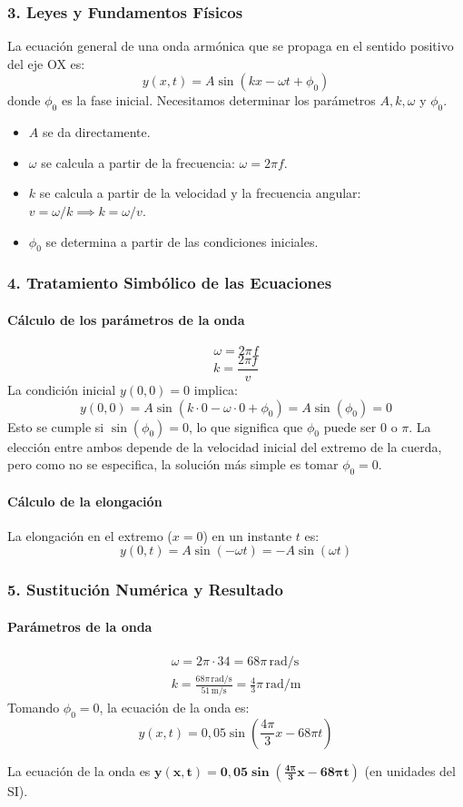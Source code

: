 \subsubsection*{3. Leyes y Fundamentos Físicos}
La ecuación general de una onda armónica que se propaga en el sentido positivo del eje OX es:
$$y(x,t) = A \sin(kx - \omega t + \phi_0)$$
donde $\phi_0$ es la fase inicial. Necesitamos determinar los parámetros $A, k, \omega$ y $\phi_0$.
\begin{itemize}
    \item $A$ se da directamente.
    \item $\omega$ se calcula a partir de la frecuencia: $\omega = 2\pi f$.
    \item $k$ se calcula a partir de la velocidad y la frecuencia angular: $v = \omega/k \implies k = \omega/v$.
    \item $\phi_0$ se determina a partir de las condiciones iniciales.
\end{itemize}

\subsubsection*{4. Tratamiento Simbólico de las Ecuaciones}
\paragraph*{Cálculo de los parámetros de la onda}
$$\omega = 2\pi f$$
$$k = \frac{2\pi f}{v}$$
La condición inicial $y(0,0)=0$ implica:
$$y(0,0) = A \sin(k\cdot 0 - \omega \cdot 0 + \phi_0) = A \sin(\phi_0) = 0$$
Esto se cumple si $\sin(\phi_0)=0$, lo que significa que $\phi_0$ puede ser $0$ o $\pi$. La elección entre ambos depende de la velocidad inicial del extremo de la cuerda, pero como no se especifica, la solución más simple es tomar $\phi_0=0$.

\paragraph*{Cálculo de la elongación}
La elongación en el extremo ($x=0$) en un instante $t$ es:
$$y(0,t) = A \sin(-\omega t) = -A \sin(\omega t)$$

\subsubsection*{5. Sustitución Numérica y Resultado}
\paragraph*{Parámetros de la onda}
\begin{gather}
    \omega = 2\pi \cdot 34 = 68\pi \, \text{rad/s} \\
    k = \frac{68\pi \, \text{rad/s}}{51 \, \text{m/s}} = \frac{4}{3}\pi \, \text{rad/m}
\end{gather}
Tomando $\phi_0=0$, la ecuación de la onda es:
$$y(x,t) = 0,05 \sin\left(\frac{4\pi}{3}x - 68\pi t\right)$$
\begin{cajaresultado}
    La ecuación de la onda es $\boldsymbol{y(x,t) = 0,05 \sin\left(\frac{4\pi}{3}x - 68\pi t\right)}$ (en unidades del SI).
\end{cajaresultado}

